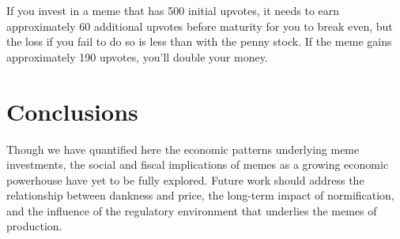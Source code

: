 \documentclass[a4paper, 12pt]{article}
\begin{document}
If you invest in a meme that has 500 initial upvotes, it needs to earn approximately 60
additional upvotes before maturity for you to break even, but the loss if you
fail to do so is less than with the penny stock. If the meme gains approximately
190 upvotes, you'll double your money.

\section*{Conclusions}
\label{sec:orgf2132a3}

Though we have quantified here the economic patterns underlying meme investments, the
social and fiscal implications of memes as a growing economic powerhouse have
yet to be fully explored. Future work should address the relationship between
dankness and price, the long-term impact of normification, and the influence of
the regulatory environment that underlies the memes of production.



\end{document}

